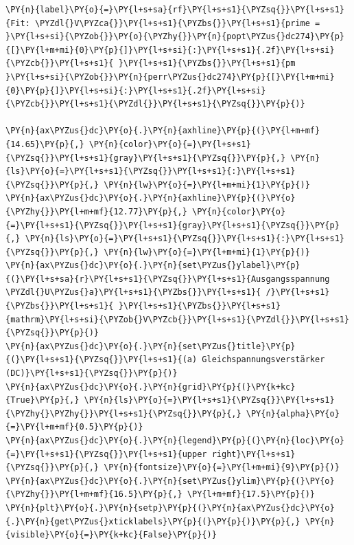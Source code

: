 \begin{tcolorbox}[breakable, size=fbox, boxrule=1pt, pad at break*=1mm,colback=cellbackground, colframe=cellborder]
\begin{Verbatim}[commandchars=\\\{\}]
           \PY{n}{label}\PY{o}{=}\PY{l+s+sa}{rf}\PY{l+s+s1}{\PYZsq{}}\PY{l+s+s1}{Fit: \PYZdl{}V\PYZca{}}\PY{l+s+s1}{\PYZbs{}}\PY{l+s+s1}{prime = }\PY{l+s+si}{\PYZob{}}\PY{o}{\PYZhy{}}\PY{n}{popt\PYZus{}dc274}\PY{p}{[}\PY{l+m+mi}{0}\PY{p}{]}\PY{l+s+si}{:}\PY{l+s+s1}{.2f}\PY{l+s+si}{\PYZcb{}}\PY{l+s+s1}{ }\PY{l+s+s1}{\PYZbs{}}\PY{l+s+s1}{pm }\PY{l+s+si}{\PYZob{}}\PY{n}{perr\PYZus{}dc274}\PY{p}{[}\PY{l+m+mi}{0}\PY{p}{]}\PY{l+s+si}{:}\PY{l+s+s1}{.2f}\PY{l+s+si}{\PYZcb{}}\PY{l+s+s1}{\PYZdl{}}\PY{l+s+s1}{\PYZsq{}}\PY{p}{)}

\PY{n}{ax\PYZus{}dc}\PY{o}{.}\PY{n}{axhline}\PY{p}{(}\PY{l+m+mf}{14.65}\PY{p}{,} \PY{n}{color}\PY{o}{=}\PY{l+s+s1}{\PYZsq{}}\PY{l+s+s1}{gray}\PY{l+s+s1}{\PYZsq{}}\PY{p}{,} \PY{n}{ls}\PY{o}{=}\PY{l+s+s1}{\PYZsq{}}\PY{l+s+s1}{:}\PY{l+s+s1}{\PYZsq{}}\PY{p}{,} \PY{n}{lw}\PY{o}{=}\PY{l+m+mi}{1}\PY{p}{)}
\PY{n}{ax\PYZus{}dc}\PY{o}{.}\PY{n}{axhline}\PY{p}{(}\PY{o}{\PYZhy{}}\PY{l+m+mf}{12.77}\PY{p}{,} \PY{n}{color}\PY{o}{=}\PY{l+s+s1}{\PYZsq{}}\PY{l+s+s1}{gray}\PY{l+s+s1}{\PYZsq{}}\PY{p}{,} \PY{n}{ls}\PY{o}{=}\PY{l+s+s1}{\PYZsq{}}\PY{l+s+s1}{:}\PY{l+s+s1}{\PYZsq{}}\PY{p}{,} \PY{n}{lw}\PY{o}{=}\PY{l+m+mi}{1}\PY{p}{)}
\PY{n}{ax\PYZus{}dc}\PY{o}{.}\PY{n}{set\PYZus{}ylabel}\PY{p}{(}\PY{l+s+sa}{r}\PY{l+s+s1}{\PYZsq{}}\PY{l+s+s1}{Ausgangsspannung \PYZdl{}U\PYZus{}a}\PY{l+s+s1}{\PYZbs{}}\PY{l+s+s1}{ /}\PY{l+s+s1}{\PYZbs{}}\PY{l+s+s1}{ }\PY{l+s+s1}{\PYZbs{}}\PY{l+s+s1}{mathrm}\PY{l+s+si}{\PYZob{}V\PYZcb{}}\PY{l+s+s1}{\PYZdl{}}\PY{l+s+s1}{\PYZsq{}}\PY{p}{)}
\PY{n}{ax\PYZus{}dc}\PY{o}{.}\PY{n}{set\PYZus{}title}\PY{p}{(}\PY{l+s+s1}{\PYZsq{}}\PY{l+s+s1}{(a) Gleichspannungsverstärker (DC)}\PY{l+s+s1}{\PYZsq{}}\PY{p}{)}
\PY{n}{ax\PYZus{}dc}\PY{o}{.}\PY{n}{grid}\PY{p}{(}\PY{k+kc}{True}\PY{p}{,} \PY{n}{ls}\PY{o}{=}\PY{l+s+s1}{\PYZsq{}}\PY{l+s+s1}{\PYZhy{}\PYZhy{}}\PY{l+s+s1}{\PYZsq{}}\PY{p}{,} \PY{n}{alpha}\PY{o}{=}\PY{l+m+mf}{0.5}\PY{p}{)}
\PY{n}{ax\PYZus{}dc}\PY{o}{.}\PY{n}{legend}\PY{p}{(}\PY{n}{loc}\PY{o}{=}\PY{l+s+s1}{\PYZsq{}}\PY{l+s+s1}{upper right}\PY{l+s+s1}{\PYZsq{}}\PY{p}{,} \PY{n}{fontsize}\PY{o}{=}\PY{l+m+mi}{9}\PY{p}{)}
\PY{n}{ax\PYZus{}dc}\PY{o}{.}\PY{n}{set\PYZus{}ylim}\PY{p}{(}\PY{o}{\PYZhy{}}\PY{l+m+mf}{16.5}\PY{p}{,} \PY{l+m+mf}{17.5}\PY{p}{)}
\PY{n}{plt}\PY{o}{.}\PY{n}{setp}\PY{p}{(}\PY{n}{ax\PYZus{}dc}\PY{o}{.}\PY{n}{get\PYZus{}xticklabels}\PY{p}{(}\PY{p}{)}\PY{p}{,} \PY{n}{visible}\PY{o}{=}\PY{k+kc}{False}\PY{p}{)}


\end{Verbatim}
\end{tcolorbox}
